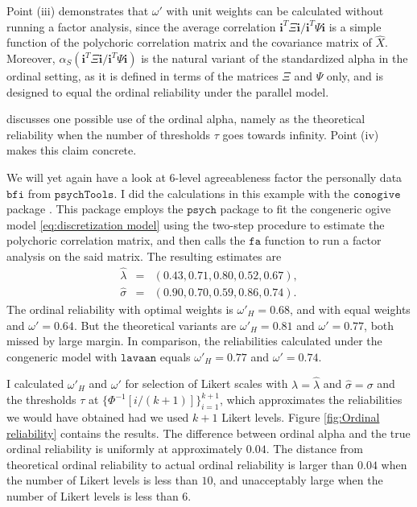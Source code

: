 \documentclass[twoside]{article}
\begin{document}
Point (iii) demonstrates that $\omega'$ with unit weights can be
calculated without running a factor analysis, since the average correlation
$\mathbf{i}^{T}\Xi\mathbf{i}/\mathbf{i}^{T}\Psi\mathbf{i}$ is a simple
function of the polychoric correlation matrix and the covariance matrix
of $\hat{X}.$ Moreover, $\alpha_S(\mathbf{i}^{T}\Xi\mathbf{i}/\mathbf{i}^{T}\Psi\mathbf{i})$
is the natural variant of the standardized alpha in the ordinal setting,
as it is defined in terms of the matrices $\Xi$ and $\Psi$ only,
and is designed to equal the ordinal reliability under the parallel
model. 

\citet[p. 1068]{Chalmers2018-fj} discusses one possible use of the
ordinal alpha, namely as the theoretical reliability when the number
of thresholds $\tau$ goes towards infinity. Point (iv) makes this
claim concrete.

\begin{example}
We will yet again have a look at $6$-level agreeableness factor the
personally data $\mathtt{bfi}$ from $\mathtt{psychTools}$. I did the calculations in this example with the $\mathtt{conogive}$ package \citep{conogive}. This package employs the $\mathtt{psych}$ \citep{psych} package to fit the congeneric ogive
model \eqref{eq:discretization model} using the two-step procedure
to estimate the polychoric correlation matrix, and then calls the $\mathtt{fa}$ function to run a factor analysis on the said matrix.
The resulting estimates are 
\begin{eqnarray*}
\hat{\lambda} & = & (0.43,0.71,0.80,0.52,0.67),\\
\hat{\sigma} & = & (0.90,0.70,0.59,0.86,0.74).
\end{eqnarray*} The ordinal reliability
with optimal weights is $\omega'_{H}=0.68$, and with equal weights
and $\omega'=0.64$. But the theoretical variants are $\omega'_{H}=0.81$
and $\omega'=0.77$, both missed by large margin. In comparison, the
reliabilities calculated under the congeneric model with $\mathtt{lavaan}$ \citep{Rosseel2012-yg}
equals $\omega'_{H}=0.77$ and $\omega'=0.74$.

I calculated $\omega'_{H}$ and $\omega'$ for selection of Likert
scales with $\lambda=\hat{\lambda}$ and $\hat{\sigma}=\sigma$ and
the thresholds $\tau$ at $\{\Phi^{-1}[i/(k+1)]\}_{i=1}^{k+1}$, which
approximates the reliabilities we would have obtained had we used
$k+1$ Likert levels. Figure \ref{fig:Ordinal reliability} contains the results. The difference between ordinal alpha and the true ordinal reliability is uniformly at approximately $0.04$. The distance from theoretical ordinal reliability to actual ordinal reliability is larger than $0.04$ when the number of Likert levels is less than $10$, and unacceptably large when the number of Likert levels is less than $6$. 
\end{example}
\end{document}
